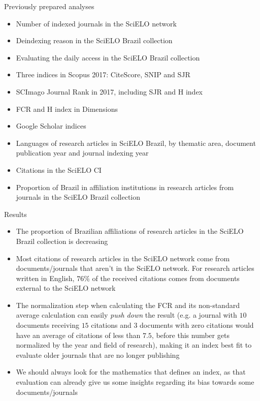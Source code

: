 \documentclass[utf8]{beamer}
\begin{document}
\begin{frame}{Previously prepared analyses}
  \begin{itemize}
    \item Number of indexed journals in the SciELO network
    \item Deindexing reason in the SciELO Brazil collection
    \item Evaluating the daily access in the SciELO Brazil collection
    \item Three indices in Scopus 2017: CiteScore, SNIP and SJR
    \item SCImago Journal Rank in 2017, including SJR and H index
    \item FCR and H index in Dimensions
    \item Google Scholar indices
    \item Languages of research articles in SciELO Brazil,
          by thematic area,
             document publication year and
             journal indexing year
    \item Citations in the SciELO CI
    \item Proportion of Brazil in affiliation institutions
          in research articles
          from journals in the SciELO Brazil collection
  \end{itemize}
\end{frame}


\begin{frame}{Results}
  \begin{itemize}
    \item The proportion of Brazilian affiliations
          of research articles in the SciELO Brazil collection
          is decreasing
    \item Most citations of research articles in the SciELO network
          come from documents/journals
          that aren't in the SciELO network.
          For research articles written in English,
          $76\%$ of the received citations
          comes from documents external to the SciELO network
    \item The normalization step when calculating
          the FCR and its non-standard average calculation
          can easily \emph{push down} the result
          (e.g. a journal with $10$ documents receiving $15$ citations
           and $3$ documents with zero citations
           would have an average of citations of less than $7.5$,
           before this number gets normalized
           by the year and field of research),
          making it an index best fit to evaluate older journals
          that are no longer publishing
    \item We should always look for
          the mathematics that defines an index,
          as that evaluation can already give us some insights
          regarding its bias towards some documents/journals
  \end{itemize}
\end{frame}
\end{document}
